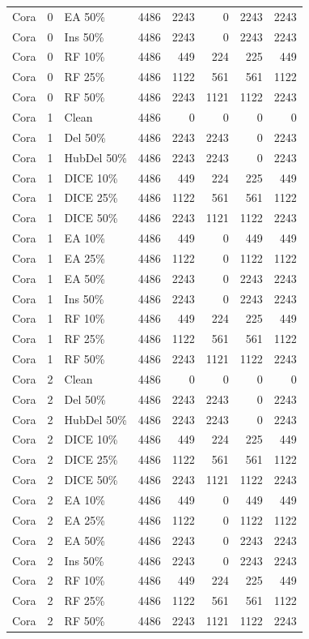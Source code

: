 {\begin{longtable}{lr l rrrrr}
Cora & 0 & EA 50\% & 4486 & 2243 & 0 & 2243 & 2243 \\
Cora & 0 & Ins 50\% & 4486 & 2243 & 0 & 2243 & 2243 \\
Cora & 0 & RF 10\% & 4486 & 449 & 224 & 225 & 449 \\
Cora & 0 & RF 25\% & 4486 & 1122 & 561 & 561 & 1122 \\
Cora & 0 & RF 50\% & 4486 & 2243 & 1121 & 1122 & 2243 \\
Cora & 1 & Clean & 4486 & 0 & 0 & 0 & 0 \\
Cora & 1 & Del 50\% & 4486 & 2243 & 2243 & 0 & 2243 \\
Cora & 1 & HubDel 50\% & 4486 & 2243 & 2243 & 0 & 2243 \\
Cora & 1 & DICE 10\% & 4486 & 449 & 224 & 225 & 449 \\
Cora & 1 & DICE 25\% & 4486 & 1122 & 561 & 561 & 1122 \\
Cora & 1 & DICE 50\% & 4486 & 2243 & 1121 & 1122 & 2243 \\
Cora & 1 & EA 10\% & 4486 & 449 & 0 & 449 & 449 \\
Cora & 1 & EA 25\% & 4486 & 1122 & 0 & 1122 & 1122 \\
Cora & 1 & EA 50\% & 4486 & 2243 & 0 & 2243 & 2243 \\
Cora & 1 & Ins 50\% & 4486 & 2243 & 0 & 2243 & 2243 \\
Cora & 1 & RF 10\% & 4486 & 449 & 224 & 225 & 449 \\
Cora & 1 & RF 25\% & 4486 & 1122 & 561 & 561 & 1122 \\
Cora & 1 & RF 50\% & 4486 & 2243 & 1121 & 1122 & 2243 \\
Cora & 2 & Clean & 4486 & 0 & 0 & 0 & 0 \\
Cora & 2 & Del 50\% & 4486 & 2243 & 2243 & 0 & 2243 \\
Cora & 2 & HubDel 50\% & 4486 & 2243 & 2243 & 0 & 2243 \\
Cora & 2 & DICE 10\% & 4486 & 449 & 224 & 225 & 449 \\
Cora & 2 & DICE 25\% & 4486 & 1122 & 561 & 561 & 1122 \\
Cora & 2 & DICE 50\% & 4486 & 2243 & 1121 & 1122 & 2243 \\
Cora & 2 & EA 10\% & 4486 & 449 & 0 & 449 & 449 \\
Cora & 2 & EA 25\% & 4486 & 1122 & 0 & 1122 & 1122 \\
Cora & 2 & EA 50\% & 4486 & 2243 & 0 & 2243 & 2243 \\
Cora & 2 & Ins 50\% & 4486 & 2243 & 0 & 2243 & 2243 \\
Cora & 2 & RF 10\% & 4486 & 449 & 224 & 225 & 449 \\
Cora & 2 & RF 25\% & 4486 & 1122 & 561 & 561 & 1122 \\
Cora & 2 & RF 50\% & 4486 & 2243 & 1121 & 1122 & 2243 \\
\end{longtable}
}
